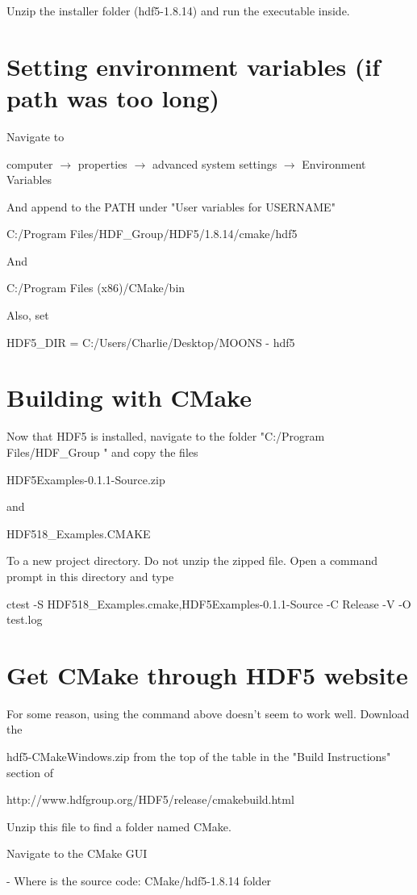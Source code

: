 \documentclass[11pt]{article}
\begin{document}
Unzip the installer folder (hdf5-1.8.14) and run the executable inside.

\section{Setting environment variables (if path was too long)}
Navigate to 

computer $\rightarrow$ properties $\rightarrow$ advanced system settings $\rightarrow$ Environment Variables

And append to the PATH under "User variables for USERNAME"

C:/Program Files/HDF\_Group/HDF5/1.8.14/cmake/hdf5

And

C:/Program Files (x86)/CMake/bin

Also, set

HDF5\_DIR = C:/Users/Charlie/Desktop/MOONS - hdf5

\section{Building with CMake}

Now that HDF5 is installed, navigate to the folder "C:/Program Files/HDF\_Group " and copy the files

HDF5Examples-0.1.1-Source.zip

and 

HDF518\_Examples.CMAKE

To a new project directory. Do not unzip the zipped file. Open a command prompt in this directory and type

ctest -S HDF518\_Examples.cmake,HDF5Examples-0.1.1-Source -C Release -V -O test.log

\section{Get CMake through HDF5 website}

For some reason, using the command above doesn't seem to work well. Download the 

hdf5-CMakeWindows.zip from the top of the table in the "Build Instructions" section of 

http://www.hdfgroup.org/HDF5/release/cmakebuild.html

Unzip this file to find a folder named CMake.

Navigate to the CMake GUI

- Where is the source code: CMake/hdf5-1.8.14 folder
\end{document}
